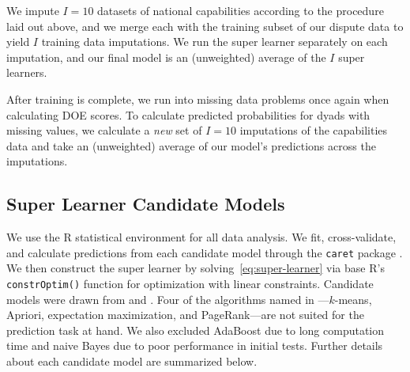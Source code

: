 We impute $I = 10$ datasets of national capabilities according to the procedure laid out above, and we merge each with the training subset of our dispute data to yield $I$ training data imputations.
We run the super learner separately on each imputation, and our final model is an (unweighted) average of the $I$ super learners.

After training is complete, we run into missing data problems once again when calculating DOE scores.
To calculate predicted probabilities for dyads with missing values, we calculate a \emph{new} set of $I = 10$ imputations of the capabilities data and take an (unweighted) average of our model's predictions across the imputations.

\subsection{Super Learner Candidate Models}

We use the R statistical environment  for all data analysis.
We fit, cross-validate, and calculate predictions from each candidate model through the \texttt{caret} package .
We then construct the super learner by solving~\eqref{eq:super-learner} via base R's \texttt{constrOptim()} function for optimization with linear constraints.
Candidate models were drawn from \citet{Wu:2007ev} and \citet{FernandezDelgado:2014ul}.
Four of the algorithms named in \citet{Wu:2007ev}---$k$-means, Apriori, expectation maximization, and PageRank---are not suited for the prediction task at hand.
We also excluded AdaBoost due to long computation time and naive Bayes due to poor performance in initial tests.
Further details about each candidate model are summarized below.

